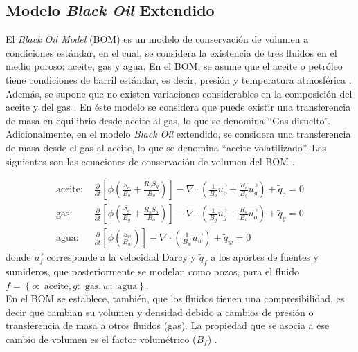\subsection[Modelo \emph{Black Oil} Extendido]{Modelo {\normalfont \bfseries \itshape Black Oil} Extendido}\label{subsec:BOM}

El \textit{Black Oil Model} (BOM) es un modelo de conservación de volumen a condiciones estándar, en el cual, se considera la existencia de tres fluidos en el medio poroso: aceite, gas y agua. En el BOM, se asume que el aceite o petróleo tiene condiciones de barril estándar, es decir, presión y temperatura atmosférica \citep{chen2007reservoir}. Además, se supone que no existen variaciones considerables en la composición del aceite y del gas \citep{jamal2006petroleum, chen2007reservoir, ertekin2001basic}. En éste modelo se considera que puede existir una transferencia de masa en equilibrio desde aceite al gas, lo que se denomina ``Gas disuelto''. Adicionalmente, en el modelo \textit{Black Oil} extendido, se considera una transferencia de masa desde el gas al aceite, lo que se denomina ``aceite volatilizado''. Las siguientes son las ecuaciones de conservación de volumen del BOM \citep{jamal2006petroleum, chen2007reservoir, ertekin2001basic}.

\begin{align}
\label{ec:aceite}
\text{aceite: }&\frac{\partial}{\partial t} \left[ \phi \left( \frac{S_{o}}{B_{o}} + \frac{R_{v} S_{g}}{B_{g}} \right) \right]
- \nabla \cdot \left( \frac{1}{B_{o}} \vec{u_{o}} + \frac{R_{v}}{B_{g}} \vec{u_{g}} \right) + \tilde{q}_{o}=0  \\
\label{ec:gas}
\text{gas: }&\frac{\partial}{\partial t} \left[ \phi \left( \frac{S_{g}}{B_{g}} + \frac{R_{s} S_{o}}{B_{o}} \right) \right]
- \nabla \cdot \left( \frac{1}{B_{g}} \vec{u_{g}} + \frac{R_{s}}{B_{o}} \vec{u_{o}} \right) + \tilde{q}_{g} = 0 \\
\label{ec:agua}
\text{agua: }&\frac{\partial}{\partial t} \left[\phi \left( \frac{S_{w}}{B_{w}} \right) \right] - \nabla \cdot \left( \frac{1}{B_{w}} \vec{u_{w}} \right) + \tilde{q}_{w} = 0 
\end{align}
donde $\vec{u_{f}}$ corresponde a la velocidad Darcy y $\tilde{q}_{f}$ a los aportes de fuentes y sumideros, que posteriormente se modelan como pozos, para el fluido $f = \left\lbrace o:\text{ aceite}, g:\text{ gas}, w:\text{ agua} \right\rbrace $.\\

En el BOM se establece, también, que los fluidos tienen una compresibilidad, es decir que cambian su volumen y densidad debido a cambios de presión o transferencia de masa a otros fluidos (gas). La propiedad que se asocia a ese cambio de volumen es el factor volumétrico ($B_{f}$) \citep{chen2007reservoir}.\\

